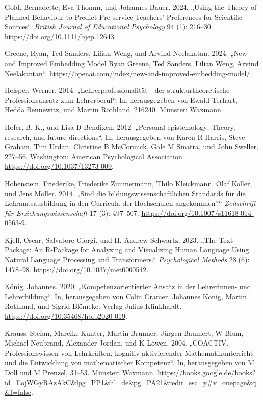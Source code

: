 \documentclass[
  letterpaper,
  DIV=11]{scrartcl}
\newlength{\cslhangindent}
\newenvironment{CSLReferences}[2] %
 {\begin{list}{}{%
  \setlength{\itemindent}{0pt}
  \setlength{\leftmargin}{0pt}
  \setlength{\parsep}{0pt}
  \ifodd #1
   \setlength{\leftmargin}{\cslhangindent}
   \setlength{\itemindent}{-1\cslhangindent}
  \fi
  \setlength{\itemsep}{#2\baselineskip}}}
 {\end{list}}
\begin{document}
\begin{CSLReferences}{1}{0}
Gold, Bernadette, Eva Thomm, und Johannes Bauer. 2024. {„Using the
Theory of Planned Behaviour to Predict Pre‐service Teachers' Preferences
for Scientific Sources``}. \emph{British Journal of Educational
Psychology} 94 (1): 216--30. \url{https://doi.org/10.1111/bjep.12643}.

Greene, Ryan, Ted Sanders, Lilian Weng, und Arvind Neelakatan. 2024.
{„New and Improved Embedding Model Ryan Greene, Ted Sanders, Lilian
Weng, Arvind Neelakantan``}.
\url{https://openai.com/index/new-and-improved-embedding-model/}.

Helsper, Werner. 2014. {„Lehrerprofessionalität - der
strukturtheoretische Professionsansatz zum Lehrerberuf``}. In,
herausgegeben von Ewald Terhart, Hedda Bennewitz, und Martin Rothland,
216240. Münster: Waxmann.

Hofer, B. K., und Lisa D Bendixen. 2012. {„Personal epistemology:
Theory, research, and future directions``}. In, herausgegeben von Karen
R Harris, Steve Graham, Tim Urdan, Christine B McCormick, Gale M
Sinatra, und John Sweller, 227--56. Washington: American Psychological
Association. \url{https://doi.org/10.1037/13273-009}.

Hohenstein, Friederike, Friederike Zimmermann, Thilo Kleickmann, Olaf
Köller, und Jens Möller. 2014. {„Sind die bildungswissenschaftlichen
Standards für die Lehramtsausbildung in den Curricula der Hochschulen
angekommen?``} \emph{Zeitschrift für Erziehungswissenschaft} 17 (3):
497--507. \url{https://doi.org/10.1007/s11618-014-0563-9}.

Kjell, Oscar, Salvatore Giorgi, und H. Andrew Schwartz. 2023. {„The
Text-Package: An R-Package for Analyzing and Visualizing Human Language
Using Natural Language Processing and Transformers.``}
\emph{Psychological Methods} 28 (6): 1478--98.
\url{https://doi.org/10.1037/met0000542}.

König, Johannes. 2020. {„Kompetenzorientierter Ansatz in der
Lehrerinnen- und Lehrerbildung``}. In, herausgegeben von Colin Cramer,
Johannes König, Martin Rothland, und Sigrid Blömeke. Verlag Julius
Klinkhardt. \url{https://doi.org/10.35468/hblb2020-019}.

Krauss, Stefan, Mareike Kunter, Martin Brunner, Jürgen Baumert, W Blum,
Michael Neubrand, Alexander Jordan, und K Löwen. 2004. {„COACTIV.
Professionswissen von Lehrkräften, kognitiv aktivierender
Mathematikunterricht und die Entwicklung von mathematischer
Kompetenz``}. In, herausgegeben von M Doll und M Prenzel, 31--53.
Münster: Waxmann.
\url{https://books.google.de/books?id=EojWGyRAzAkC&lpg=PP1&hl=de&pg=PA21&redir_esc=y\#v=onepage&q&f=false}.


\end{CSLReferences}
\end{document}
